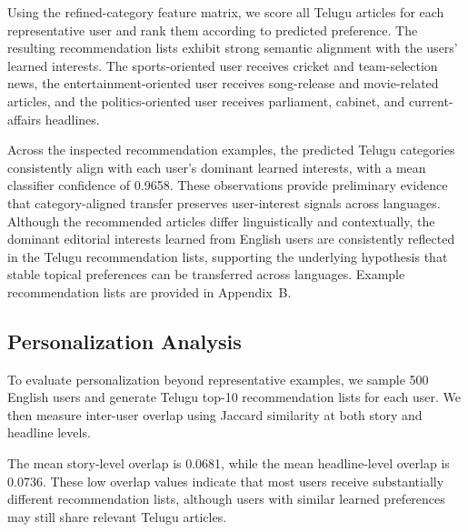 \documentclass[conference]{IEEEtran}
\begin{document}
\begin{table}[t]
\centering
\caption{Representative English user profiles used for Telugu recommendation examples}
\label{tab:top3_affinities}
\small
{}
\end{table}

Using the refined-category feature matrix, we score all Telugu articles for each representative user and rank them according to predicted preference. The resulting recommendation lists exhibit strong semantic alignment with the users' learned interests. The sports-oriented user receives cricket and team-selection news, the entertainment-oriented user receives song-release and movie-related articles, and the politics-oriented user receives parliament, cabinet, and current-affairs headlines.

Across the inspected recommendation examples, the predicted Telugu categories consistently align with each user's dominant learned interests, with a mean classifier confidence of 0.9658. These observations provide preliminary evidence that category-aligned transfer preserves user-interest signals across languages. Although the recommended articles differ linguistically and contextually, the dominant editorial interests learned from English users are consistently reflected in the Telugu recommendation lists, supporting the underlying hypothesis that stable topical preferences can be transferred across languages. Example recommendation lists are provided in Appendix~B.

\subsection{Personalization Analysis}

To evaluate personalization beyond representative examples, we sample 500 English users and generate Telugu top-10 recommendation lists for each user. We then measure inter-user overlap using Jaccard similarity at both story and headline levels.

The mean story-level overlap is 0.0681, while the mean headline-level overlap is 0.0736. These low overlap values indicate that most users receive substantially different recommendation lists, although users with similar learned preferences may still share relevant Telugu articles.
\end{document}
